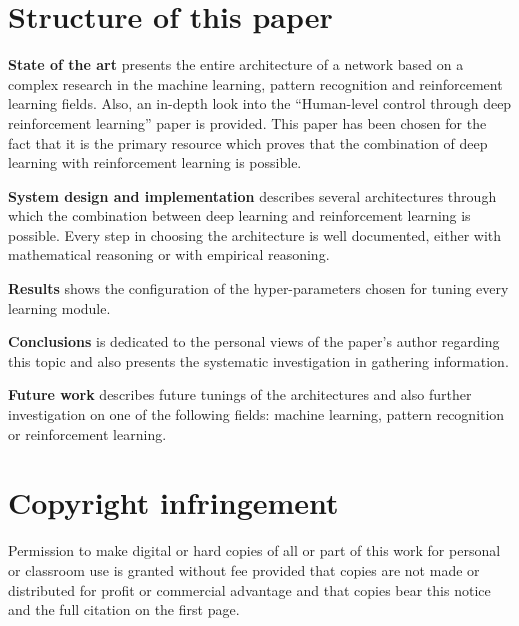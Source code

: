 \section{Structure of this paper}
\label{sec:paper_structure}

 \textbf{State of the art} presents the entire architecture of a network based on a complex research in the machine learning, pattern recognition and reinforcement learning fields. Also, an in-depth look into the ``Human-level control through deep reinforcement learning'' paper is provided. This paper has been chosen for the fact that it is the primary resource which proves that the combination of deep learning with reinforcement learning is possible. 

 \textbf{System design and implementation} describes several architectures through which the combination between deep learning and reinforcement learning is possible. Every step in choosing the architecture is well documented, either with mathematical reasoning or with empirical reasoning.

 \textbf{Results} shows the configuration of the hyper-parameters chosen for tuning every learning module.

 \textbf{Conclusions} is dedicated to the personal views of the paper's author regarding this topic and also presents the systematic investigation in gathering information.

 \textbf{Future work} describes future tunings  of the architectures and also further investigation on one of the following fields: machine learning, pattern recognition or reinforcement learning.

\section{Copyright infringement}
\label{sec:copyright}
Permission to make digital or hard copies of all or part of this work for personal or classroom use is granted without fee provided that copies are not made or distributed for profit or commercial advantage and that copies bear this notice and the full citation on the first page. 







